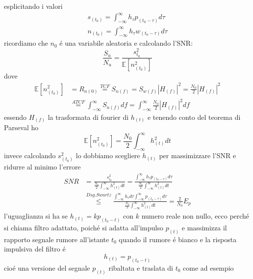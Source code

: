         esplicitando i valori
        \begin{gather}
            s_{(t_0)} = \int_{-\infty}^{\infty} h_{\tau} p_{(t_0-\tau)}d\tau \nonumber\\
            n_{(t_0)} = \int_{-\infty}^{\infty} h_{\tau} w_{(t_0-\tau)}d\tau \nonumber
        \end{gather}
        ricordiamo che $n_0$ é una variabile aleatoria e calcolando l'SNR:
        \[
            \frac{S_u}{N_u} = \frac{s^2_{t_0}}{\mathbb{E}[n^2_{(t_0)}]}  
        \]
        dove 
        \begin{align}
            \mathbb{E}[n^2_{(t_0)}] &= R_{n(0)} \overset{TCF}{=} S_{n(f)} = S_{w(f)}\left|H_{(f)}\right|^2 = \frac{N_0}{2}\left|H_{(f)}\right|^2 \nonumber \\
                                    &\overset{ATCF}{=} \int_{-\infty}^{\infty} S_{n(f)} df = \int_{-\infty}^{\infty} \frac{N_0}{2}\left|H_{(f)}\right|^2 df \nonumber            
        \end{align}
        essendo $H_{(f)}$ la trasformata di fourier di $h_{(t)}$ e tenendo conto del teorema di Parseval ho
        \[
            \mathbb{E}[n^2_{(t_0)}] = \frac{N_0}{2}\int_{-\infty}^{\infty} h_{(t)}^2 dt
        \]
        invece calcolando $s^2_{(t_0)}$ lo dobbiamo scegliere $h_{(t)}$ per massimizzare l'SNR e ridurre al minimo l'errore
        \begin{align}
            SNR &= \frac{s^2_{t_0}}{\frac{N_0}{2}\int_{-\infty}^{\infty} h_{(t)}^2 dt} = \frac{\int_{-\infty}^{\infty} h_{\tau} p_{(t_0-\tau)}d\tau}{\frac{N_0}{2}\int_{-\infty}^{\infty} h_{(t)}^2 dt} \nonumber \\
                &\overset{Dsg. Swartz}{\leq} \frac{\int_{-\infty}^{\infty} h_{\tau}d\tau \int_{-\infty}^{\infty} p_{(t_0-\tau)}d\tau}{\frac{N_0}{2}\int_{-\infty}^{\infty} h_{(t)}^2 dt} = \frac{2}{N_0}E_p \nonumber
        \end{align}        
        l'uguaglianza si ha se $h_{(t)} = kp_{(t_0-t)}$ con $k$ numero reale non nullo, ecco perché si chiama filtro adattato, poiché si adatta all'impulso $p_{(t)}$ e 
        massimizza il rapporto segnale rumore all'istante $t_0$ quando il rumore é bianco e la risposta impulsiva del filtro é 
        \[
            h_{(t)} = p_{(t_0-t)}  
        \]     
        cioé una versione del segnale $p_{(t)}$ ribaltata e traslata di $t_{0}$ come ad esempio 
        \begin{figure}[H]
            \centering
            \hfill
        \end{figure}
